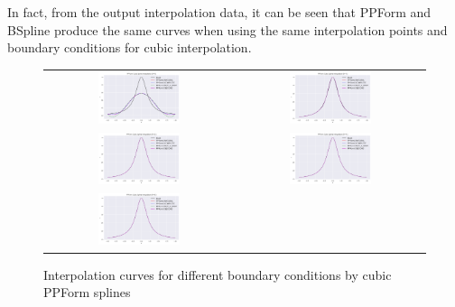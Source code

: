 \documentclass[a4paper]{article}
\begin{document}
\begin{sloppypar}
In fact, from the output interpolation data, it can be seen that PPForm and
BSpline produce the same curves when using the same interpolation points and
boundary conditions for cubic interpolation.

\begin{figure}[H]
  \centering
  \begin{tabular}{cc}
    \includegraphics[width=0.45\textwidth]{../figure/problemA/PPForm3_N6.png}  &
    \includegraphics[width=0.45\textwidth]{../figure/problemA/PPForm3_N11.png}   \\
    \includegraphics[width=0.45\textwidth]{../figure/problemA/PPForm3_N21.png} &
    \includegraphics[width=0.45\textwidth]{../figure/problemA/PPForm3_N41.png}   \\
    \includegraphics[width=0.45\textwidth]{../figure/problemA/PPForm3_N81.png} &
  \end{tabular}
  \renewcommand{\figurename}{Fig.}
  \caption{Interpolation curves for different boundary conditions by cubic PPForm splines}
  \label{fig:A_ppform3}
\end{figure}


\end{sloppypar}
\end{document}
